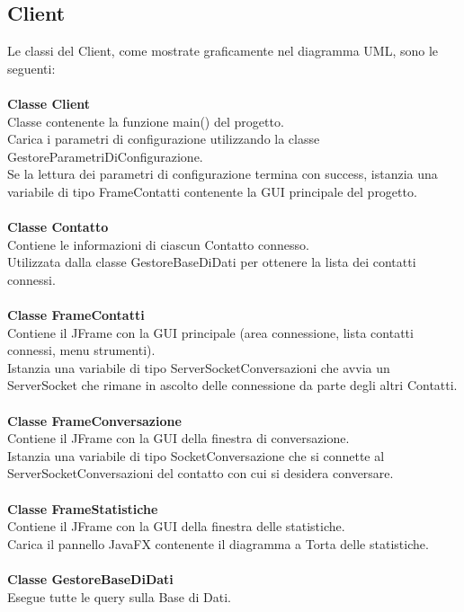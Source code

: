 \documentclass[a4paper, 11pt]{article} %
\begin{document}
\subsection{Client}

Le classi del Client, come mostrate graficamente nel diagramma UML, sono le seguenti:\\
\\
\textbf{Classe Client}\\
Classe contenente la funzione main() del progetto.\\
Carica i parametri di configurazione utilizzando la classe GestoreParametriDiConfigurazione.\\
Se la lettura dei parametri di configurazione termina con success, istanzia una variabile di tipo FrameContatti contenente la GUI principale del progetto.\\
\\
\textbf{Classe Contatto}\\
Contiene le informazioni di ciascun Contatto connesso.\\
Utilizzata dalla classe GestoreBaseDiDati per ottenere la lista dei contatti connessi.\\
\\
\textbf{Classe FrameContatti}\\
Contiene il JFrame con la GUI principale (area connessione, lista contatti connessi, menu strumenti).\\
Istanzia una variabile di tipo ServerSocketConversazioni che avvia un ServerSocket che rimane in ascolto delle connessione da parte degli altri Contatti.\\
\\
\textbf{Classe FrameConversazione}\\
Contiene il JFrame con la GUI della finestra di conversazione.\\
Istanzia una variabile di tipo SocketConversazione che si connette al  ServerSocketConversazioni del contatto con cui si desidera conversare.\\
\\
\textbf{Classe FrameStatistiche}\\
Contiene il JFrame con la GUI della finestra delle statistiche.\\
Carica il pannello JavaFX contenente il diagramma a Torta delle statistiche.\\
\\
\textbf{Classe GestoreBaseDiDati}\\
Esegue tutte le query sulla Base di Dati.\\
\end{document}
